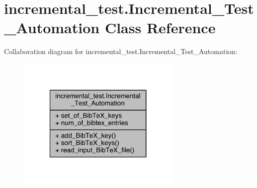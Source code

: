 \hypertarget{classincremental__test_1_1Incremental__Test__Automation}{}\section{incremental\+\_\+test.\+Incremental\+\_\+\+Test\+\_\+\+Automation Class Reference}
\label{classincremental__test_1_1Incremental__Test__Automation}


Collaboration diagram for incremental\+\_\+test.\+Incremental\+\_\+\+Test\+\_\+\+Automation\+:\nopagebreak
\begin{figure}[H]
\begin{center}
\leavevmode
\includegraphics[width=224pt]{d3/d8e/classincremental__test_1_1Incremental__Test__Automation__coll__graph}
\end{center}
\end{figure}
